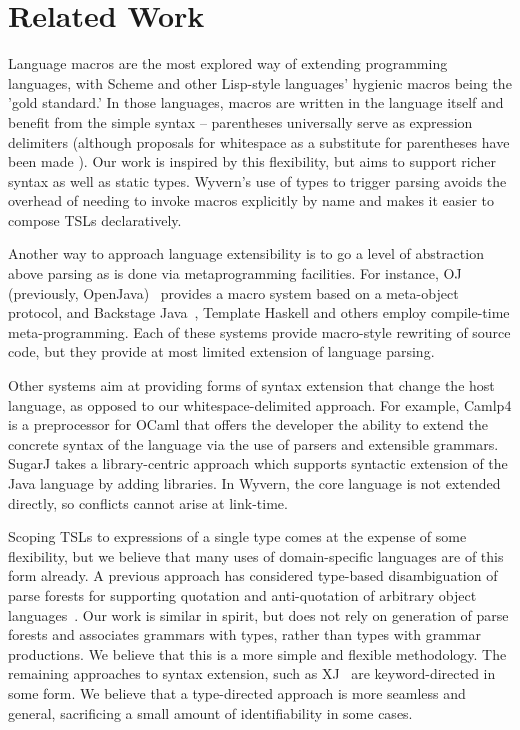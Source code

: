 \section{Related Work}
\label{s:related}

Language macros are the most explored way of extending programming languages, with Scheme and other Lisp-style languages' hygienic macros being the 'gold standard.' In those languages, macros are written in the language itself and benefit from the simple syntax -- parentheses universally serve as expression delimiters (although proposals for whitespace as a substitute for parentheses have been made \cite{srfi-49}). Our work is inspired by this flexibility, but aims to support richer syntax as well as static types. Wyvern's use of types to trigger parsing  avoids the overhead of needing to invoke macros explicitly by name and makes it easier to compose TSLs declaratively.

Another way to approach language extensibility is to go a level of abstraction above parsing as is done via metaprogramming facilities. For instance, OJ (previously, OpenJava)~\cite{Tatsubori00openjava:a} provides a macro system based on a meta-object protocol, and Backstage Java~\cite{Palmer:2011:BJM:2048066.2048137}, Template Haskell \cite{sheard2002template} and others employ compile-time meta-programming.  Each of these systems provide macro-style rewriting of source code, but they provide at most limited extension of language parsing.

Other systems aim at providing forms of syntax extension that change the host language, as opposed to our whitespace-delimited approach.  For example, Camlp4 \cite{camlp4} is a preprocessor for OCaml that offers the developer the ability to extend the concrete syntax of the language via the use of parsers and extensible grammars.  SugarJ \cite{Erdweg:2011:SLL:2048147.2048199} takes a library-centric approach which supports syntactic extension of the Java language by adding libraries. In Wyvern, the core language
is not extended directly, so conflicts cannot arise at link-time.

Scoping TSLs to expressions of a single type comes at the expense of some flexibility, but we believe that many uses of domain-specific languages are of this form already. A previous approach has considered type-based disambiguation of parse forests for supporting quotation and anti-quotation of arbitrary object languages~\cite{bravenboer2005generalized}. Our work is similar in spirit, but does not rely on generation of parse forests and associates grammars with types, rather than types with grammar productions. We believe that this is a more simple and flexible methodology. The remaining approaches to syntax extension, such as XJ~\cite{DBLP:conf/scam/ClarkSW08} are keyword-directed in some form. We believe that a type-directed approach is more seamless and general, sacrificing a small amount of identifiability in some cases.

